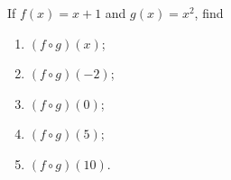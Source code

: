 If $f(x)=x+1$ and $g(x)=x^2$, find
\begin{enumerate}
\item[(a)] $(f\circ g)(x)$;
\item[(b)] $(f\circ g)(-2)$;
\item[(c)] $(f\circ g)(0)$;
\item[(d)] $(f\circ g)(5)$;
\item[(e)] $(f\circ g)(10)$.
\end{enumerate}
